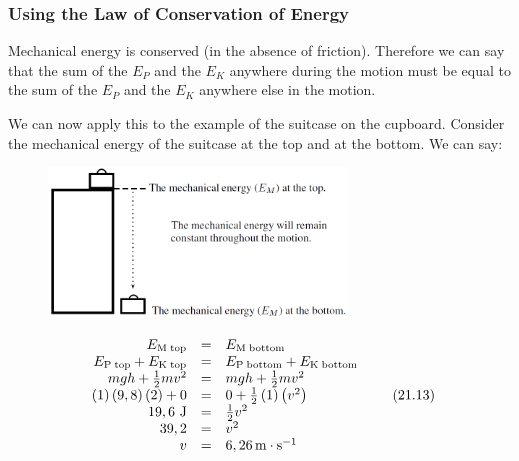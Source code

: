             \subsubsection{ Using the Law of Conservation of Energy}
            \nopagebreak
        \label{m38786*id68660}Mechanical energy is conserved (in the absence of friction). Therefore we can say that the sum of the ${E}_{P}$ and the ${E}_{K}$ anywhere during the motion must be equal to the sum of the ${E}_{P}$ and the ${E}_{K}$ anywhere else in the motion.\par 
        \label{m38786*id68713}We can now apply this to the example of the suitcase on the cupboard. Consider the mechanical energy of the suitcase at the top and at the bottom. We can say:\par 
        \label{m38786*id68720}
    \setcounter{subfigure}{0}
	\begin{figure}[H] %
    \begin{center}
    \label{m38786*id68723!!!underscore!!!media}\label{m38786*id68723!!!underscore!!!printimage}\includegraphics[width=300px]{col11305.imgs/m38786_PG10C3_009.png} %
      \vspace{2pt}
    \vspace{.1in}
    \end{center}
 \end{figure}       
        \par 
        \label{m38786*id68729}\nopagebreak\noindent{}
    \begin{equation}
    \begin{array}{ccc}\hfill {E}_{\mathrm{M\; top}}& =& {E}_{\mathrm{M\; bottom}}\hfill \\ \hfill {E}_{\mathrm{P\; top}}+{E}_{\mathrm{K\; top}}& =& {E}_{\mathrm{P\; bottom}}+{E}_{\mathrm{K\; bottom}}\hfill \\ \hfill mgh+\frac{1}{2}m{v}^{2}& =& mgh+\frac{1}{2}m{v}^{2}\hfill \\ \hfill \left(1\right)\left(9,8\right)\left(2\right)+0& =& 0+\frac{1}{2}\left(1\right)\left({v}^{2}\right)\hfill \\ \hfill 19,6\phantom{\rule{3.33333pt}{0ex}}\mathrm{J}& =& \frac{1}{2}{v}^{2}\hfill \\ \hfill 39,2& =& {v}^{2}\hfill \\ \hfill v& =& 6,26\phantom{\rule{0.166667em}{0ex}}\mathrm{m}\ensuremath{\cdot}{\mathrm{s}}^{-1}\hfill \end{array}\tag{21.13}
      \end{equation}

